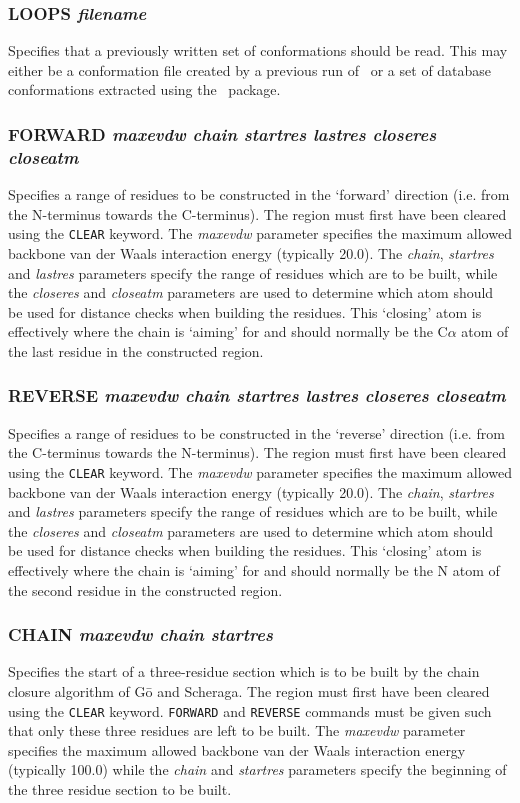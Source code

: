 \subsubsection{LOOPS {\em filename}}
Specifies that a previously written set of conformations should be read. This
may either be a conformation file created by a previous run of \cs\ or a 
set of database conformations extracted using the \abm\ package.

\subsubsection{FORWARD {\em maxevdw chain startres lastres closeres closeatm}}
Specifies a range of residues to be constructed in the `forward' direction
(i.e. from the N-terminus towards the C-terminus). 
The region must first have been cleared using the {\tt CLEAR} keyword.
The {\em maxevdw\/} 
parameter specifies the maximum allowed backbone van der Waals interaction
energy (typically 20.0). 
The {\em chain}, {\em startres\/} and {\em lastres\/} parameters
specify the range of residues which are to be built, while the {\em closeres\/}
and {\em closeatm\/} parameters are used to determine which atom should be
used for distance checks when building the residues. This `closing' atom is
effectively where the chain is `aiming' for and should normally be the
C$\alpha$ atom of the last residue in the constructed region.

\subsubsection{REVERSE {\em maxevdw chain startres lastres closeres closeatm}}
Specifies a range of residues to be constructed in the `reverse' direction
(i.e. from the C-terminus towards the N-terminus). 
The region must first have been cleared using the {\tt CLEAR} keyword.
The {\em maxevdw\/} 
parameter specifies the maximum allowed backbone van der Waals interaction
energy (typically 20.0). 
The {\em chain}, {\em startres\/} and {\em lastres\/} parameters
specify the range of residues which are to be built, while the {\em closeres\/}
and {\em closeatm\/} parameters are used to determine which atom should be
used for distance checks when building the residues. This `closing' atom is
effectively where the chain is `aiming' for and should normally be the
N atom of the second residue in the constructed region.


\subsubsection{CHAIN {\em maxevdw chain startres}}
Specifies the start of a three-residue section which is to be built by the
chain closure algorithm of G\={o} and Scheraga\cite{go:closure}. 
The region must first have been cleared using the {\tt CLEAR} keyword.
{\tt FORWARD} and {\tt REVERSE}
commands must be given such that only these three residues are left to be
built. The {\em maxevdw\/} parameter specifies the maximum allowed backbone 
van der Waals interaction energy (typically 100.0) while the {\em chain} 
and {\em startres\/} parameters specify the beginning of the three residue 
section to be built.

